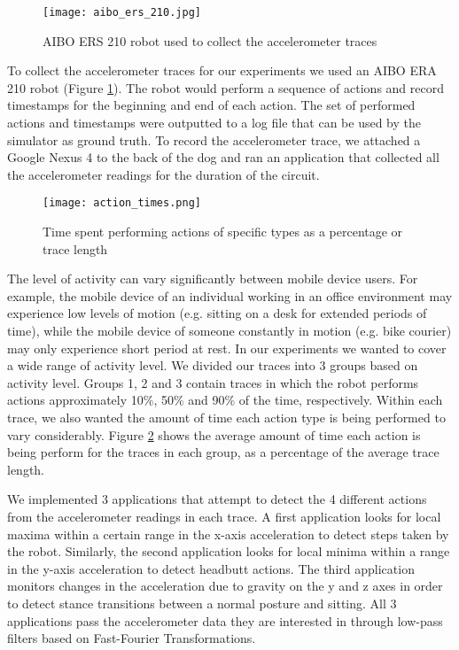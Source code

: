 \begin{figure}[t]
	\texttt{[image: aibo\_ers\_210.jpg]}
	\caption{AIBO ERS 210 robot used to collect the accelerometer traces}
	\label{fig:aibo}
\end{figure}

To collect the accelerometer traces for our experiments we used an AIBO ERA 210 robot (Figure \ref{fig:aibo}). The robot would perform a sequence of actions and record timestamps for the beginning and end of each action. The set of performed actions and timestamps were outputted to a log file that can be used by the simulator as ground truth. To record the accelerometer trace, we attached a Google Nexus 4 to the back of the dog and ran an application that collected all the accelerometer readings for the duration of the circuit.

\begin{figure}[t]
	\texttt{[image: action\_times.png]}
	\caption{Time spent performing actions of specific types as a percentage or trace length}
	\label{fig:actionTimes}
\end{figure}

The level of activity can vary significantly between mobile device users. For example, the mobile device of an individual working in an office environment may experience low levels of motion (e.g. sitting on a desk for extended periods of time), while the mobile device of someone constantly in motion (e.g. bike courier) may only experience short period at rest. In our experiments we wanted to cover a wide range of activity level. We divided our traces into 3 groups based on activity level. Groups 1, 2 and 3 contain traces in which the robot performs actions approximately 10\%, 50\% and 90\% of the time, respectively. Within each trace, we also wanted the amount of time each action type is being performed to vary considerably. Figure \ref{fig:actionTimes} shows the average amount of time each action is being perform for the traces in each group, as a percentage of the average trace length.

We implemented 3 applications that attempt to detect the 4 different actions from the accelerometer readings in each trace. A first application looks for local maxima within a certain range in the x-axis acceleration to detect steps taken by the robot. Similarly, the second application looks for local minima within a range in the y-axis acceleration to detect headbutt actions. The third application monitors changes in the acceleration due to gravity on the y and z axes in order to detect stance transitions between a normal posture and sitting. All 3 applications pass the accelerometer data they are interested in through low-pass filters based on Fast-Fourier Transformations.


